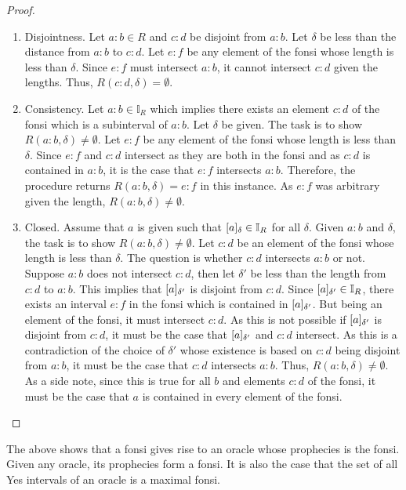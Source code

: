 \documentclass[12pt]{article}
\begin{document}
\begin{proof}
\begin{enumerate}
        \item Disjointness. Let $a:b \in R$ and $c:d$ be disjoint from $a:b$. Let $\delta$ be less than the distance from $a:b$ to $c:d$. Let $e:f$ be any element of the fonsi whose length is less than $\delta$. Since $e:f$ must intersect $a:b$, it cannot intersect $c:d$ given the lengths. Thus, $R(c:d, \delta) = \emptyset$. 
    
        \item Consistency. Let $a:b \in \mathbb{I}_R$ which implies there exists an element $c:d$ of the fonsi which is a subinterval of $a:b$. Let  $ \delta$ be given. The task is to show $R(a:b, \delta) \neq \emptyset$. Let $e:f$ be any element of the fonsi whose length is less than $\delta$. Since $e:f$ and $c:d$ intersect as they are both in the fonsi and as $c:d$ is contained in $a:b$, it is the case that $e:f$ intersects $a:b$. Therefore, the procedure returns $R(a:b, \delta) = e:f$ in this instance. As $e:f$ was arbitrary given the length, $R(a:b, \delta) \neq \emptyset$. 
        
        \item Closed. Assume that $a$ is given such that $\halo{a} \in \mathbb{I}_R$ for all $\delta$. Given $a:b$ and $\delta$, the task is to show $R(a:b, \delta) \neq \emptyset$. Let $c:d$ be an element of the fonsi whose length is less than $\delta$. The question is whether $c:d$ intersects $a:b$ or not. Suppose $a:b$ does not intersect $c:d$, then let $\delta'$  be less than the length from $c:d$ to $a:b$. This implies that $\halo[\delta']{a}$ is disjoint from $c:d$. Since $\halo[\delta']{a} \in \mathbb{I}_R$, there exists an interval $e:f$ in the fonsi which is contained in $\halo[\delta']{a}$. But being an element of the fonsi, it must intersect $c:d$. As this is not possible if $\halo[\delta']{a}$ is disjoint from $c:d$, it must be the case that $\halo[\delta']{a}$ and $c:d$ intersect. As this is a contradiction of the choice of $\delta'$ whose existence is based on $c:d$ being disjoint from $a:b$, it must be the case that $c:d$ intersects $a:b$. Thus, $R(a:b, \delta) \neq \emptyset$. As a side note, since this is true for all $b$ and elements $c:d$ of the fonsi, it must be the case that $a$ is contained in every element of the fonsi. 
    \end{enumerate}

\end{proof}

The above shows that a fonsi gives rise to an oracle whose prophecies is the fonsi. Given any oracle, its prophecies form a fonsi. It is also the case that the set of all Yes intervals of an oracle is a maximal fonsi. 
\end{document}
